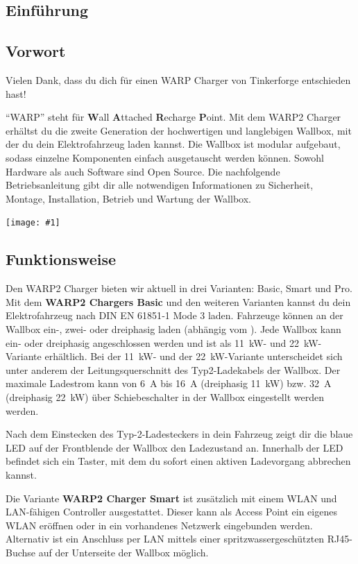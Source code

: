 \documentclass[a4paper,10pt]{article}
\newcommand{\gfx}[1]{\texttt{[image: \#1]}}
\begin{document}
\begin{multicols*}{2}
	\tableofcontents \section{Einführung}
	\subsection{Vorwort} Vielen Dank, dass du
	dich für einen WARP Charger von Tinkerforge entschieden hast!

	\enquote{WARP} steht
	für \textbf{W}all \textbf{A}ttached
	\textbf{R}echarge \textbf{P}oint. Mit dem WARP2 Charger
	erhältst du die zweite Generation der hochwertigen und langlebigen Wallbox,
	mit der du dein Elektrofahrzeug laden kannst.
	Die Wallbox ist modular aufgebaut, sodass
	einzelne Komponenten einfach ausgetauscht werden können. Sowohl Hardware als
	auch Software sind Open Source. Die nachfolgende Betriebsanleitung gibt dir
	alle notwendigen Informationen zu Sicherheit, Montage, Installation, Betrieb
	und Wartung der Wallbox.

	\vfill
	\gfx{./img_warp2/resized/type_2_connector_ready}

	\subsection{Funktionsweise}
	Den WARP2 Charger bieten wir aktuell in drei Varianten: Basic, Smart und Pro.
	Mit dem \textbf{WARP2 Chargers Basic} und den weiteren Varianten kannst du dein
	Elektrofahrzeug nach DIN EN 61851‐1 Mode 3 laden.
	Fahrzeuge können an der Wallbox ein-, zwei- oder dreiphasig laden
	(abhängig vom ). Jede Wallbox kann ein- oder dreiphasig
	angeschlossen werden und ist als \SI{11}{\kilo\watt}- und
	\SI{22}{\kilo\watt}-Variante erhältlich. Bei der \SI{11}{\kilo\watt}- und
	der \SI{22}{\kilo\watt}-Variante unterscheidet sich unter anderem der
	Leitungsquerschnitt des Typ2-Ladekabels der Wallbox. Der maximale Ladestrom
	kann von \SI{6}{\ampere} bis \SI{16}{\ampere}
	(dreiphasig \SI{11}{\kilo\watt}) bzw. \SI{32}{\ampere} (dreiphasig \SI{22}{\kilo\watt}) über
	Schiebeschalter in der Wallbox eingestellt werden werden.

	Nach dem Einstecken des Typ-2-Ladesteckers in
	dein Fahrzeug zeigt dir die blaue LED auf der Frontblende der Wallbox den
	Ladezustand an. Innerhalb der LED befindet sich ein Taster, mit dem
	du sofort einen aktiven Ladevorgang abbrechen kannst.

	Die Variante \textbf{WARP2 Charger Smart} ist zusätzlich mit einem WLAN und
	LAN-fähigen Controller ausgestattet.
	Dieser kann als \nohyphens{Access} Point ein eigenes WLAN eröffnen oder in
	ein vorhandenes Netzwerk eingebunden werden. Alternativ ist ein Anschluss
	per LAN mittels einer spritzwassergeschützten RJ45-Buchse auf der
	Unterseite der Wallbox möglich.


\end{multicols*}
\end{document}
